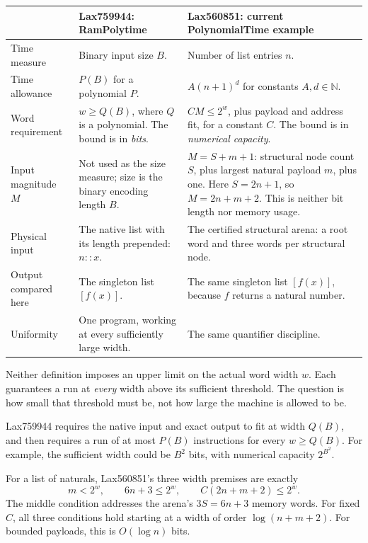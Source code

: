 \documentclass[11pt,a4paper]{article}
\begin{document}
\begingroup
\small
\renewcommand{\arraystretch}{1.16}
\begin{tabularx}{\textwidth}{@{}p{}YY@{}}
\toprule
 & \textbf{Lax759944: RamPolytime} & \textbf{Lax560851: current PolynomialTime example} \\
\midrule
Time measure & Binary input size $B$. & Number of list entries $n$. \\
Time allowance & $P(B)$ for a polynomial $P$. & $A(n+1)^d$ for constants $A,d\in\mathbb N$. \\
Word requirement & $w\ge Q(B)$, where $Q$ is a polynomial. The bound is in \emph{bits}. & $CM\le 2^w$, plus payload and address fit, for a constant $C$. The bound is in \emph{numerical capacity}. \\
Input magnitude $M$ & Not used as the size measure; size is the binary encoding length $B$. & $M=S+m+1$: structural node count $S$, plus largest natural payload $m$, plus one. Here $S=2n+1$, so $M=2n+m+2$. This is neither bit length nor memory usage. \\
Physical input & The native list with its length prepended: $n::x$. & The certified structural arena: a root word and three words per structural node. \\
Output compared here & The singleton list $[f(x)]$. & The same singleton list $[f(x)]$, because $f$ returns a natural number. \\
Uniformity & One program, working at every sufficiently large width. & The same quantifier discipline. \\
\bottomrule
\end{tabularx}
\endgroup

Neither definition imposes an upper limit on the actual word width $w$.
Each guarantees a run at \emph{every} width above its sufficient threshold.
The question is how small that threshold must be, not how large the machine
is allowed to be.

Lax759944 requires the native input and exact output to fit at width $Q(B)$,
and then requires a run of at most $P(B)$ instructions for every $w\ge Q(B)$.
For example, the sufficient width could be $B^2$ bits, with numerical
capacity $2^{B^2}$.

For a list of naturals, Lax560851's three width premises are exactly
\[
  m<2^w,\qquad 6n+3\le 2^w,\qquad C(2n+m+2)\le 2^w.
\]
The middle condition addresses the arena's $3S=6n+3$ memory words.
For fixed $C$, all three conditions hold starting at a width of order
$\log(n+m+2)$. For bounded payloads, this is $O(\log n)$ bits.
\end{document}
